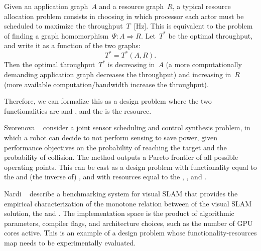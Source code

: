 Given an application graph~$A$ and a resource graph~$R$, a typical resource allocation problem consists in choosing in which processor each actor must be scheduled to maximize the throughput~$T$~[Hz].
This is equivalent to the problem of finding a graph homomorphism~$\Psi \colon A \Rightarrow R$.
Let~$T^{\ast}$ be the optimal throughput, and write it as a function of the two graphs:
\begin{equation*}
    T^{\ast}=T^{\ast}(A,R).
\end{equation*}
Then the optimal throughput~$T^{\ast}$ is decreasing in~$A$ (a more computationally demanding application graph decreases the throughput) and increasing in~$R$ (more available computation/bandwidth increase the throughput).

Therefore, we can formalize this as a design problem where the two functionalities are  and , and the  is the resource.

\begin{figure*}[h!]
    \centering
    \caption{}
\end{figure*}


\begin{example}
    Svorenova\,\,\etal~\cite{svorenova16resource} consider a joint sensor scheduling and control synthesis problem, in which a robot can decide to not perform sensing to save power, given performance objectives on the probability of reaching the target and the probability of collision.
    The method outputs a Pareto frontier of all possible operating points.
    This can be cast as a design problem with functionality equal to the  and (the inverse of) , and with resources equal to the
    , , and .
\end{example}

\begin{figure}[h]
    \centering
    \caption{}
    \label{fig:progressive-1-1}
\end{figure}


\begin{example}
    Nardi\,\,\etal~\cite{zia16comparative} describe a benchmarking system for visual SLAM that provides the empirical characterization of the monotone relation between  of the visual
    SLAM solution, the  and .
    The implementation space is the product of algorithmic parameters, compiler flags, and architecture choices, such as the number of GPU cores active.
    This is an example of a design problem whose functionality-resources map needs to be experimentally evaluated.
\end{example}

